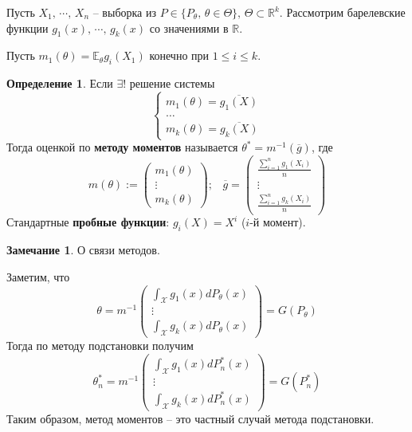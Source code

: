 \documentclass[a4paper,12pt]{article}
\renewcommand{\leq}{\ensuremath{\leqslant}}
\theoremstyle{plain}
\theoremstyle{definition}
\newtheorem{definition}{Определение}[section]
\newtheorem*{note}{Замечание}
\theoremstyle{remark}
\begin{document}
Пусть $X_1,\,\cdots,\,X_n$ -- выборка из $P \in \{P_\theta,\, \theta \in \Theta\},\, \Theta \subset \mathbb{R}^k$. Рассмотрим барелевские функции $g_1(x),\,\cdots,\,g_k(x)$ со значениями в $\mathbb{R}$.

Пусть $m_1(\theta) = \mathbb{E}_\theta g_i(X_1)$ конечно при $1 \leq i \leq k$. 

\begin{definition}
  Если $\exists!$ решение системы
  \[
    \begin{cases}
      m_1(\theta) = \overline{g_1(X)}\\
      \dots\\
      m_k(\theta) = \overline{g_k(X)}
    \end{cases}
  \]
  Тогда оценкой по \textbf{методу моментов} называется $\theta^* = m^{-1}(\overline{g})$, где
  \[
    m(\theta) := \begin{pmatrix}
      m_1(\theta)\\
      \vdots\\
      m_k(\theta)
    \end{pmatrix};\;\;\;
    \overline{g} = \begin{pmatrix}
      \frac{\sum_{i = 1}^n g_1(X_i)}{n}\\
      \vdots\\
      \frac{\sum_{i = 1}^n g_k(X_i)}{n}
    \end{pmatrix}
  \]
  Стандартные \textbf{пробные функции}: $g_i(X) = X^i$ ($i$-й момент).
\end{definition}

\begin{note}
  О связи методов.

  Заметим, что
  \[
    \theta = m^{-1}\begin{pmatrix}
      \int_\mathcal{X} g_1(x)dP_\theta(x)\\
      \vdots\\
      \int_\mathcal{X} g_k(x)dP_\theta(x)
    \end{pmatrix} = G(P_\theta)
  \]
  Тогда по методу подстановки получим
  \[
    \theta_n^* = m^{-1}\begin{pmatrix}
      \int_\mathcal{X} g_1(x)dP^*_n(x)\\
      \vdots\\
      \int_\mathcal{X} g_k(x)dP_n^*(x)
    \end{pmatrix} = G(P_n^*)
  \]
  Таким образом, метод моментов -- это частный случай метода подстановки.
\end{note}
\end{document}
